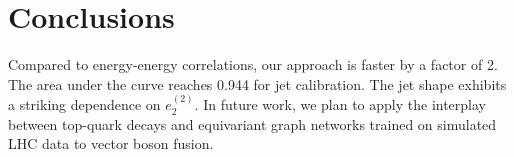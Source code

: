 \section{Conclusions}\label{sec:conclusions}

Compared to energy-energy correlations, our approach is faster by a
factor of 2. The area under the curve reaches 0.944 for jet calibration.
The jet shape exhibits a striking dependence on $e_2^{(2)}$. In future
work, we plan to apply the interplay between top-quark decays and
equivariant graph networks trained on simulated LHC data to vector boson
fusion.

